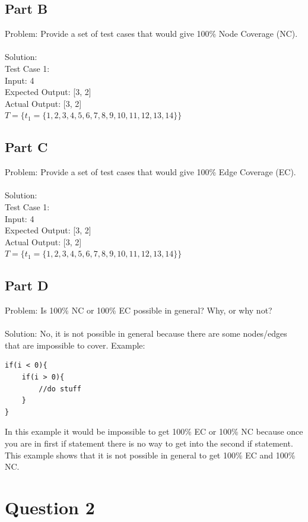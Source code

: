 \documentclass{article}
\begin{document}
\subsection*{Part B}
Problem: Provide a set of test cases that would give 100\% Node Coverage (NC). \\\\
Solution:\\
Test Case 1: \\
Input: 4 \\
Expected Output: [3, 2]\\
Actual Output: [3, 2]\\
$T = \{ t_1 = \{1, 2, 3, 4, 5, 6, 7, 8, 9, 10, 11, 12, 13, 14\}\}$
\subsection*{Part C}
Problem: Provide a set of test cases that would give 100\% Edge Coverage (EC). \\\\
Solution: \\
Test Case 1: \\
Input: 4 \\
Expected Output: [3, 2]\\
Actual Output: [3, 2]\\
$T = \{ t_1 = \{1, 2, 3, 4, 5, 6, 7, 8, 9, 10, 11, 12, 13, 14\}\}$
\subsection*{Part D}
Problem: Is 100\% NC or 100\% EC possible in general? Why, or why not? \\\\
Solution: 
No, it is not possible in general because there are some nodes/edges that are impossible to cover.
Example: 
\begin{Verbatim}[tabsize=4]
if(i < 0){
	if(i > 0){
		//do stuff
	}
}	
\end{Verbatim}
In this example it would be impossible to get 100\% EC or 100\% NC because once you are in first if statement there is no way to get into the second if statement. This example shows that it is not possible in general to get 100\% EC and 100\% NC.
\newpage

\section*{Question 2}
\end{document}
